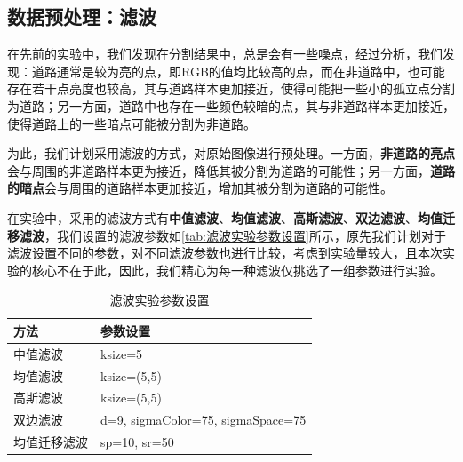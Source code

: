 \documentclass[12pt,hyperref,a4paper,UTF8]{ctexart}
\begin{document}
\subsection{数据预处理：滤波}
在先前的实验中，我们发现在分割结果中，总是会有一些噪点，经过分析，我们发现：道路通常是较为亮的点，即RGB的值均比较高的点，而在非道路中，也可能存在若干点亮度也较高，其与道路样本更加接近，使得可能把一些小的孤立点分割为道路；另一方面，道路中也存在一些颜色较暗的点，其与非道路样本更加接近，使得道路上的一些暗点可能被分割为非道路。
\par
为此，我们计划采用滤波的方式，对原始图像进行预处理。一方面，\textbf{非道路的亮点}会与周围的非道路样本更为接近，降低其被分割为道路的可能性；另一方面，\textbf{道路的暗点}会与周围的道路样本更加接近，增加其被分割为道路的可能性。
\par
在实验中，采用的滤波方式有\textbf{中值滤波}、\textbf{均值滤波}、\textbf{高斯滤波}、\textbf{双边滤波}、\textbf{均值迁移滤波}，我们设置的滤波参数如\autoref{tab:滤波实验参数设置}所示，原先我们计划对于滤波设置不同的参数，对不同滤波参数也进行比较，考虑到实验量较大，且本次实验的核心不在于此，因此，我们精心为每一种滤波仅挑选了一组参数进行实验。

\begin{table}[!htbp]

\caption{滤波实验参数设置}
    \centering
    \begin{tabular}{ll}
    \hline
        \textbf{方法} & \textbf{参数设置} \\
        \hline
        中值滤波  & ksize=5 \\
     	
        均值滤波 & ksize=(5,5) \\
        
        高斯滤波  & ksize=(5,5) \\
        
        双边滤波  & d=9, sigmaColor=75, sigmaSpace=75 \\
        
        均值迁移滤波  & sp=10, sr=50 \\
        \hline
    \end{tabular}
    \label{tab:滤波实验参数设置}
\end{table}
\end{document}

